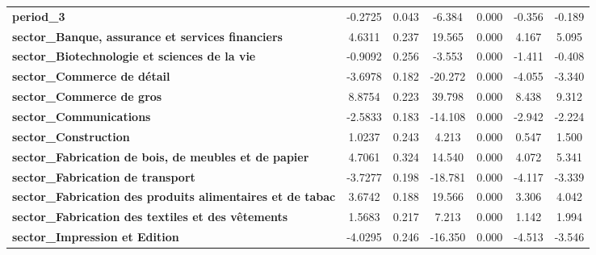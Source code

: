 \begin{center}
\begin{tabular}{lcccccc}
\textbf{period\_3}                                                    &      -0.2725  &        0.043     &    -6.384  &         0.000        &       -0.356    &       -0.189     \\
\textbf{sector\_Banque, assurance et services financiers}             &       4.6311  &        0.237     &    19.565  &         0.000        &        4.167    &        5.095     \\
\textbf{sector\_Biotechnologie et sciences de la vie}                 &      -0.9092  &        0.256     &    -3.553  &         0.000        &       -1.411    &       -0.408     \\
\textbf{sector\_Commerce de détail}                                   &      -3.6978  &        0.182     &   -20.272  &         0.000        &       -4.055    &       -3.340     \\
\textbf{sector\_Commerce de gros}                                     &       8.8754  &        0.223     &    39.798  &         0.000        &        8.438    &        9.312     \\
\textbf{sector\_Communications}                                       &      -2.5833  &        0.183     &   -14.108  &         0.000        &       -2.942    &       -2.224     \\
\textbf{sector\_Construction}                                         &       1.0237  &        0.243     &     4.213  &         0.000        &        0.547    &        1.500     \\
\textbf{sector\_Fabrication de bois, de meubles et de papier}         &       4.7061  &        0.324     &    14.540  &         0.000        &        4.072    &        5.341     \\
\textbf{sector\_Fabrication de transport}                             &      -3.7277  &        0.198     &   -18.781  &         0.000        &       -4.117    &       -3.339     \\
\textbf{sector\_Fabrication des produits alimentaires et de tabac}    &       3.6742  &        0.188     &    19.566  &         0.000        &        3.306    &        4.042     \\
\textbf{sector\_Fabrication des textiles et des vêtements}            &       1.5683  &        0.217     &     7.213  &         0.000        &        1.142    &        1.994     \\
\textbf{sector\_Impression et Edition}                                &      -4.0295  &        0.246     &   -16.350  &         0.000        &       -4.513    &       -3.546     \\

\end{tabular}
\end{center}
